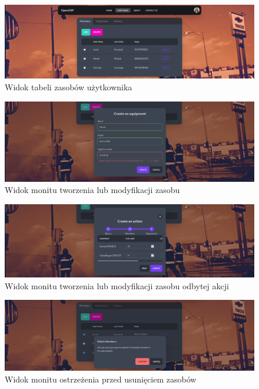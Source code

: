 \begin{figure}[!htbp]
\centering
\includegraphics[width=\textwidth]{img/chapter4/views/userpanel.png}
\caption{Widok tabeli zasobów użytkownika}
\end{figure}

\begin{figure}[!htbp]
\centering
\includegraphics[width=\textwidth]{img/chapter4/views/create.png}
\caption{Widok monitu tworzenia lub modyfikacji zasobu}
\end{figure}

\begin{figure}[!htbp]
\centering
\includegraphics[width=\textwidth]{img/chapter4/views/action.png}
\caption{Widok monitu tworzenia lub modyfikacji zasobu odbytej akcji}
\end{figure}

\begin{figure}[!htbp]
\centering
\includegraphics[width=\textwidth]{img/chapter4/views/delete.png}
\caption{Widok monitu ostrzeżenia przed usunięciem zasobów}
\end{figure}

